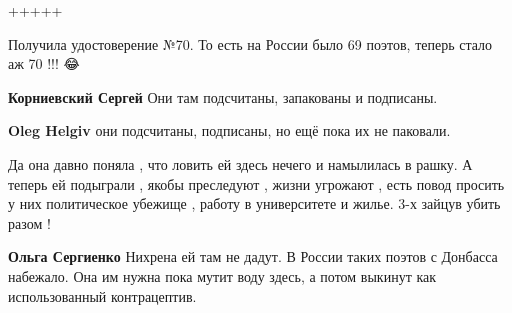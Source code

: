 \begin{itemize}
+++++

 
Получила удостоверение №70. То есть на России было 69 поэтов, теперь стало аж 70 !!!
😂

\begin{itemize}
 
\textbf{Корниевский Сергей} Они там подсчитаны, запакованы и подписаны.

 
\textbf{Oleg Helgiv} они подсчитаны, подписаны, но ещё пока их не паковали.
\end{itemize}

 

Да она давно поняла , что ловить ей здесь нечего и намылилась в рашку. А теперь
ей подыграли , якобы преследуют , жизни угрожают , есть повод просить у них
политическое убежище , работу в университете и жилье. 3-х зайцув убить разом !

\begin{itemize}
 
\textbf{Ольга Сергиенко} Нихрена ей там не дадут. В России таких поэтов с Донбасса набежало. Она им нужна пока мутит воду здесь, а потом выкинут как использованный контрацептив.

 

\end{itemize}
\end{itemize}
